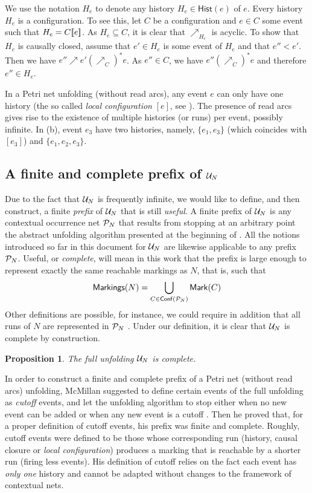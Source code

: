 \documentclass[11pt,a4paper]{article}
\newtheorem{proposition}[theorem]{Proposition}
\newcommand{\hist}[1]{\ensuremath{\mathsf{Hist}(#1)}}
\newcommand{\conf}[1]{\ensuremath{\mathsf{Conf}(#1)}}
\begin{document}
We use the notation $H_e$ to denote any history $H_e \in \hist e$ of $e$.
Every history $H_e$ is a configuration.  To see this, let $C$ be a
configuration and $e \in C$ some event such that $H_e = C [\![ e]\!]$.  As $H_e
\subseteq C$, it is clear that $\nearrow_{H_e}$ is acyclic.  To show that $H_e$
is causally closed, assume that $e' \in H_e$ is some event of $H_e$ and that
$e'' < e'$.  Then we have $e'' \nearrow e' (\nearrow_C)^* e$.  As $e'' \in C$,
we have $e'' (\nearrow_C)^* e$ and therefore $e'' \in H_e$.

In a Petri net unfolding (without read arcs), any event $e$ can only
have one history (the so called \emph{local configuration} $[e]$, see
).  The presence of read arcs gives rise to the existence of
multiple histories (or runs) per event, possibly infinite.  In 
(b), event $e_3$ have two histories, namely, $\{e_1, e_3\}$ (which coincides
with $[e_3]$) and $\{e_1, e_2, e_3\}$.


\subsection{A finite and complete prefix of $\mathcal{U}_{N}$}

Due to the fact that $\mathcal{U}_{N}$ is frequently infinite, we would like to define,
and then construct, a finite \emph{prefix} of $\mathcal{U}_{N}$ that is still
\emph{useful}.  A finite prefix of $\mathcal{U}_{N}$ is any contextual occurrence net
$\mathcal{P}_{N}$ that results from stopping at an arbitrary point the abstract
unfolding algorithm presented at the beginning of .
All the notions introduced so far in this document for $\mathcal{U}_{N}$ are likewise
applicable to any prefix $\mathcal{P}_{N}$.  Useful, or \emph{complete}, will mean in
this work that the prefix is large enough to represent exactly the same
reachable markings as $N$, that is, such that $$\markings N = \bigcup_{C \in
\conf{\pref N}} \marking{C}$$ Other definitions are possible, for instance, we
could require in addition that all runs of $N$ are represented in $\mathcal{P}_{N}$
.  Under our definition, it is clear that $\mathcal{U}_{N}$ is complete by
construction.

\begin{proposition}
\label{pro:unf.is}
The full unfolding $\mathcal{U}_{N}$ is complete.
\end{proposition}

In order to construct a finite and complete prefix of a Petri net (without read
arcs) unfolding, McMillan suggested to define certain events of the full
unfolding as \emph{cutoff} events, and let the unfolding algorithm to stop
either when no new event can be added or when any new event is a cutoff
.  Then he proved that, for a proper definition of cutoff events,
his prefix was finite and complete.  Roughly, cutoff events were defined to be
those whose corresponding run (history, causal closure or \emph{local
configuration}) produces a marking that is reachable by a shorter run (firing
less events).  His definition of cutoff relies on the fact each event has
\emph{only one} history and cannot be adapted without changes to the framework
of contextual nets.
\end{document}
